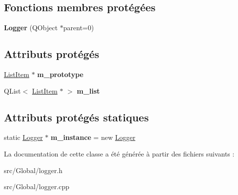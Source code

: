 \subsection*{Fonctions membres protégées}
\begin{DoxyCompactItemize}
\item 
{\bfseries Logger} (Q\+Object $\ast$parent=0)\hypertarget{class_logger_afa8685bc11b59b44d84798e867017e54}{}\label{class_logger_afa8685bc11b59b44d84798e867017e54}

\end{DoxyCompactItemize}
\subsection*{Attributs protégés}
\begin{DoxyCompactItemize}
\item 
\hyperlink{class_list_item}{List\+Item} $\ast$ {\bfseries m\+\_\+prototype}\hypertarget{class_logger_a91a11de410204a2fd0f7d29b88e19297}{}\label{class_logger_a91a11de410204a2fd0f7d29b88e19297}

\item 
Q\+List$<$ \hyperlink{class_list_item}{List\+Item} $\ast$ $>$ {\bfseries m\+\_\+list}\hypertarget{class_logger_a96dc285b52543b6773c6f1d44eb1cb0e}{}\label{class_logger_a96dc285b52543b6773c6f1d44eb1cb0e}

\end{DoxyCompactItemize}
\subsection*{Attributs protégés statiques}
\begin{DoxyCompactItemize}
\item 
static \hyperlink{class_logger}{Logger} $\ast$ {\bfseries m\+\_\+instance} = new \hyperlink{class_logger}{Logger}\hypertarget{class_logger_a59ca6bf951da7c541d9aac5024062690}{}\label{class_logger_a59ca6bf951da7c541d9aac5024062690}

\end{DoxyCompactItemize}


La documentation de cette classe a été générée à partir des fichiers suivants \+:\begin{DoxyCompactItemize}
\item 
src/\+Global/logger.\+h\item 
src/\+Global/logger.\+cpp\end{DoxyCompactItemize}
